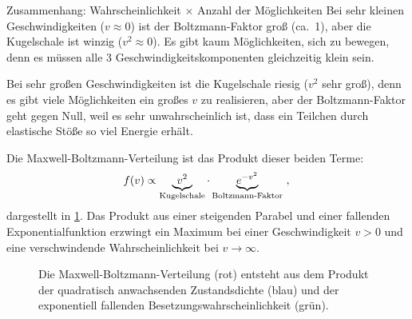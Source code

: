 \begin{rememberbox}{Zusammenhang: Wahrscheinlichkeit $\times$ Anzahl der Möglichkeiten}
    Bei sehr kleinen Geschwindigkeiten ($v \approx 0$) ist der Boltzmann-Faktor groß (ca.\ 1), aber die Kugelschale ist winzig ($v^2 \approx 0$). Es gibt kaum Möglichkeiten, sich  zu bewegen, denn es müssen alle 3 Geschwindigkeitskomponenten gleichzeitig klein sein.
    
    Bei sehr großen Geschwindigkeiten ist die Kugelschale riesig ($v^2$ sehr groß), denn es gibt viele Möglichkeiten ein großes $v$ zu realisieren, aber der Boltzmann-Faktor geht gegen Null, weil es sehr unwahrscheinlich ist, dass ein Teilchen durch elastische Stöße so viel Energie erhält.
    
    Die Maxwell-Boltzmann-Verteilung ist das Produkt dieser beiden Terme:
    \begin{equation}
        f(v) \propto \underbrace{v^2}_{\text{Kugelschale}} \cdot \underbrace{e^{-v^2}}_{\text{Boltzmann-Faktor}} \,{,}\,
    \end{equation}
    dargestellt in \cref{fig: entstehung_maxwell_boltzmann}.
    Das Produkt aus einer steigenden Parabel und einer fallenden Exponentialfunktion erzwingt ein Maximum bei einer Geschwindigkeit $v > 0$ und eine verschwindende Wahrscheinlichkeit bei $v \to \infty$.
\end{rememberbox}

\begin{figure}[htb]
    \centering
    \caption{Die Maxwell-Boltzmann-Verteilung (rot) entsteht aus dem Produkt der quadratisch anwachsenden Zustandsdichte (blau) und der exponentiell fallenden Besetzungswahrscheinlichkeit (grün).}\label{fig: entstehung_maxwell_boltzmann}
\end{figure}


